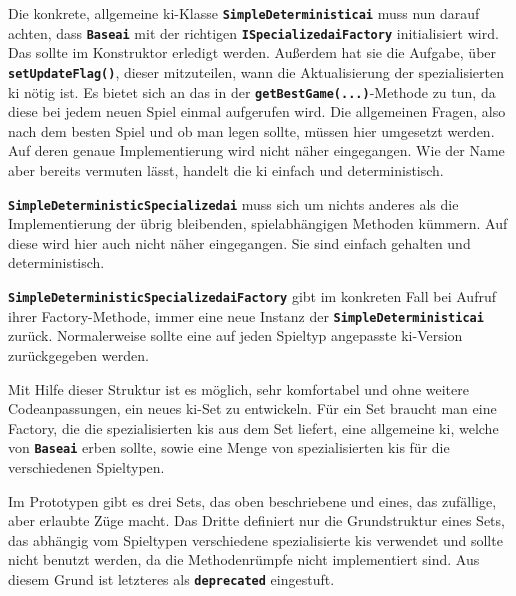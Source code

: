 \documentclass[
							a4paper, 
							11pt, 
							openany, 
							liststotoc,
							parskip=half, 
   							headings=normal
						]{scrreprt}
\begin{document}
{Die konkrete, allgemeine \acs{ki}-Klasse \textbf{\texttt{SimpleDeterministic\acs{ai}}} muss nun darauf achten, dass \textbf{\texttt{Base\acs{ai}}} mit der richtigen \textbf{\texttt{ISpecialized\acs{ai}Factory}} initialisiert wird. Das sollte im Konstruktor erledigt werden. Außerdem hat sie die Aufgabe, über \textbf{\texttt{setUpdateFlag()}}, dieser mitzuteilen, wann die Aktualisierung der spezialisierten \acs{ki} nötig ist. Es bietet sich an das in der \textbf{\texttt{getBestGame(...)}}-Methode zu tun, da diese bei jedem neuen Spiel einmal aufgerufen wird.\newline
Die allgemeinen Fragen, also nach dem besten Spiel und ob man legen sollte, müssen hier umgesetzt werden. Auf deren genaue Implementierung wird nicht näher eingegangen. Wie der Name aber bereits vermuten lässt, handelt die \acs{ki} einfach und deterministisch.

\textbf{\texttt{SimpleDeterministicSpecialized\acs{ai}}} muss sich um nichts anderes als die Implementierung der übrig bleibenden, spielabhängigen Methoden kümmern. Auf diese wird hier auch nicht näher eingegangen. Sie sind einfach gehalten und deterministisch.

\textbf{\texttt{SimpleDeterministicSpecialized\acs{ai}Factory}} gibt im konkreten Fall bei Aufruf ihrer Factory-Methode, immer eine neue Instanz der \textbf{\texttt{SimpleDeterministic\acs{ai}}} zurück. Normalerweise sollte eine auf jeden Spieltyp angepasste \acs{ki}-Version zurückgegeben werden.\bigskip

\clearpage

Mit Hilfe dieser Struktur ist es möglich, sehr komfortabel und ohne weitere Codeanpassungen, ein neues \acs{ki}-Set zu entwickeln. Für ein Set braucht man eine Factory, die die spezialisierten \acs{ki}s aus dem Set liefert, eine allgemeine \acs{ki}, welche von \textbf{\texttt{Base\acs{ai}}} erben sollte, sowie eine Menge von spezialisierten \acs{ki}s für die verschiedenen Spieltypen.

Im Prototypen gibt es drei Sets, das oben beschriebene und eines, das zufällige, aber erlaubte Züge macht. Das Dritte definiert nur die Grundstruktur eines Sets, das abhängig vom Spieltypen verschiedene spezialisierte \acs{ki}s verwendet und sollte nicht benutzt werden, da die Methodenrümpfe nicht implementiert sind. Aus diesem Grund ist letzteres als \textbf{\texttt{deprecated}} eingestuft.
\clearpage

}
\end{document}
